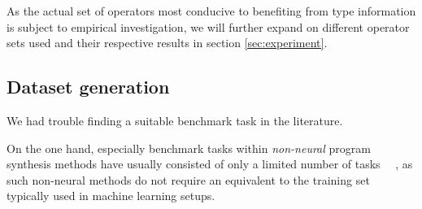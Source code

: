 \documentclass{article}
\begin{document}
As the actual set of operators most conducive to benefiting
from type information is subject to empirical investigation,
we will further expand on different operator sets used
and their respective results in section \ref{sec:experiment}.

\subsection{Dataset generation} \label{sec:datagen}


We had trouble finding a suitable benchmark task in the literature.

On the one hand, especially benchmark tasks within \emph{non-neural} program synthesis methods have usually consisted of only a limited number of tasks%
~\citep{myth,lambda2,typedmil,houdini,tamandu,dilp}~\cite{terpret},
as such non-neural methods do not require an equivalent to the training set typically used in machine learning setups.
\end{document}
